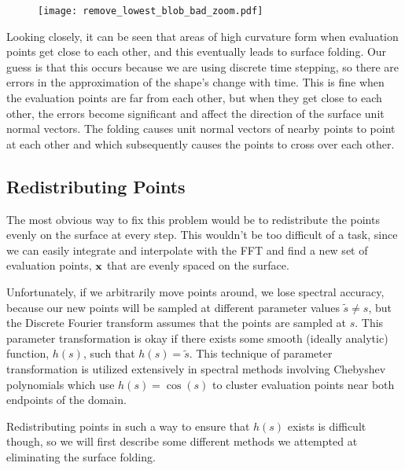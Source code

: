 \begin{figure}[H]
    \begin{center}
      \texttt{[image: remove\_lowest\_blob\_bad\_zoom.pdf]}
    \end{center}
  \vspace{-.2in} %
  \caption{\label{fig:remove-lowest-blog-bad-zoom}}
\end{figure}

Looking closely, it can be seen that areas of high curvature form when evaluation points get close to each other, and this eventually leads to surface folding. Our guess is that this occurs because we are using discrete time stepping, so there are errors in the approximation of the shape's change with time. This is fine when the evaluation points are far from each other, but when they get close to each other, the errors become significant and affect the direction of the surface unit normal vectors. The folding causes unit normal vectors of nearby points to point at each other and which subsequently causes the points to cross over each other.

\subsection*{Redistributing Points}

The most obvious way to fix this problem would be to redistribute the points evenly on the surface at every step. This wouldn't be too difficult of a task, since we can easily integrate and interpolate with the FFT and find a new set of evaluation points, $\mathbf{x}$ that are evenly spaced on the surface. 

Unfortunately, if we arbitrarily move points around, we lose spectral accuracy, because our new points will be sampled at different parameter values $\tilde{s} \ne s$, but the Discrete Fourier transform assumes that the points are sampled at $s$. This parameter transformation is okay if there exists some smooth (ideally analytic) function, $h(s)$, such that $h(s) = \tilde{s}$. This technique of parameter transformation is utilized extensively in spectral methods involving Chebyshev polynomials which use $h(s) = \cos(s)$ to cluster evaluation points near both endpoints of the domain.

Redistributing points in such a way to ensure that $h(s)$ exists is difficult though, so we will first describe some different methods we attempted at eliminating the surface folding.

